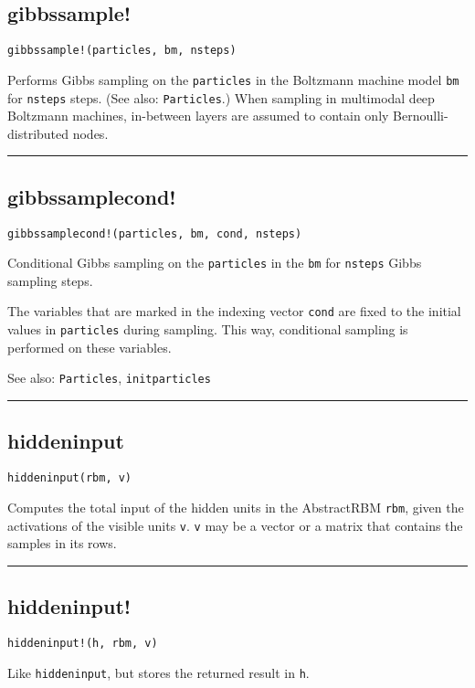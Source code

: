 \subsection*{gibbssample!}
\begin{verbatim}
gibbssample!(particles, bm, nsteps)
\end{verbatim}
Performs Gibbs sampling on the \texttt{particles} in the Boltzmann machine model \texttt{bm} for \texttt{nsteps} steps. (See also: \texttt{Particles}.) When sampling in multimodal deep Boltzmann machines, in-between layers are assumed to contain only Bernoulli-distributed nodes.

\noindent\rule{\textwidth}{1pt}
\subsection*{gibbssamplecond!}
\begin{verbatim}
gibbssamplecond!(particles, bm, cond, nsteps)
\end{verbatim}
Conditional Gibbs sampling on the \texttt{particles} in the \texttt{bm} for \texttt{nsteps} Gibbs sampling steps.

The variables that are marked in the indexing vector \texttt{cond} are fixed to the initial values in \texttt{particles} during sampling. This way, conditional sampling is performed on these variables.

See also: \texttt{Particles}, \texttt{initparticles}

\noindent\rule{\textwidth}{1pt}
\subsection*{hiddeninput}
\begin{verbatim}
hiddeninput(rbm, v)
\end{verbatim}
Computes the total input of the hidden units in the AbstractRBM \texttt{rbm}, given the activations of the visible units \texttt{v}. \texttt{v} may be a vector or a matrix that contains the samples in its rows.

\noindent\rule{\textwidth}{1pt}
\subsection*{hiddeninput!}
\begin{verbatim}
hiddeninput!(h, rbm, v)
\end{verbatim}
Like \texttt{hiddeninput}, but stores the returned result in \texttt{h}.

